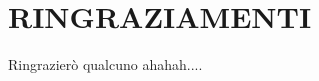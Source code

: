 
\bigskip

\begingroup
\let\clearpage\relax
\let\cleardoublepage\relax
\let\cleardoublepage\relax
\chapter*{RINGRAZIAMENTI}
Ringrazierò qualcuno ahahah.... 

\endgroup